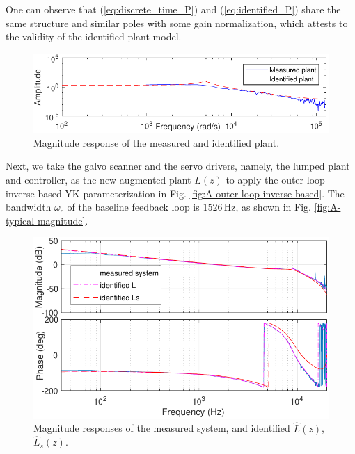 \documentclass [11pt, proquest] {uwthesis}[2020/02/24]
\begin{document}
One can observe that (\ref{eq:discrete_time_P}) and (\ref{eq:identified_P})
share the same structure and similar poles with some gain normalization,
which attests to the validity of the identified plant model. 
\begin{figure}[!ht]
\begin{centering}
\includegraphics[width=13cm]{Loop-shaping/plant_estimation_tf_reduced}
\par\end{centering}
\caption{\label{fig:Magnitude-response-of}Magnitude response of the measured
and identified plant.}
\end{figure}

Next, we take the galvo scanner and the servo drivers, namely, the
lumped plant and controller, as the new augmented plant $L(z)$ to
apply the outer-loop inverse-based YK parameterization in Fig. \ref{fig:A-outer-loop-inverse-based}.
The bandwidth $\omega_{c}$ of the baseline feedback loop is $1526\,\text{Hz}$,
as shown in Fig. \ref{fig:A-typical-magnitude}.
\begin{figure}[!ht]
\begin{centering}
\includegraphics[width=13cm]{Loop-shaping/integrated_L_Ls_tf}
\par\end{centering}
\caption{\label{fig:Magnitude-response-of-1}Magnitude responses of the measured
system, and identified $\hat{L}(z)$, $\hat{L}_{s}(z)$.}
\end{figure}
\end{document}
